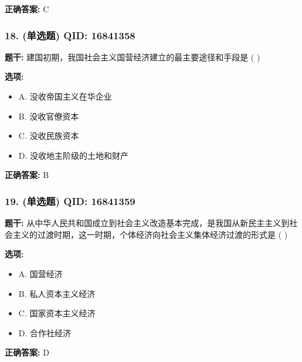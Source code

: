 \documentclass[12pt,UTF8]{ctexart}
\begin{document}
\textbf{正确答案:}
C

\vspace{0.3em}\hrulefill\vspace{0.7em}

\subsubsection*{18. (单选题) \small QID: 16841358}

\textbf{题干:}
建国初期，我国社会主义国营经济建立的最主要途径和手段是 ( )

\textbf{选项:}
\begin{itemize}[leftmargin=*]

  \item A. 没收帝国主义在华企业

  \item B. 没收官僚资本

  \item C. 没收民族资本

  \item D. 没收地主阶级的土地和财产

\end{itemize}

\textbf{正确答案:}
B

\vspace{0.3em}\hrulefill\vspace{0.7em}

\subsubsection*{19. (单选题) \small QID: 16841359}

\textbf{题干:}
从中华人民共和国成立到社会主义改造基本完成，是我国从新民主主义到社会主义的过渡时期，这一时期，个体经济向社会主义集体经济过渡的形式是 ( )

\textbf{选项:}
\begin{itemize}[leftmargin=*]

  \item A. 国营经济

  \item B. 私人资本主义经济

  \item C. 国家资本主义经济

  \item D. 合作社经济

\end{itemize}

\textbf{正确答案:}
D
\end{document}
